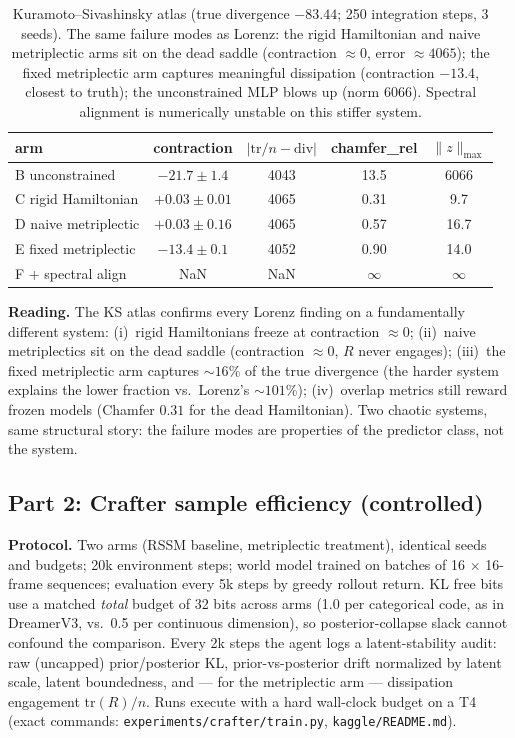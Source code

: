 \documentclass[preprint,12pt]{article}
\begin{document}
\begin{table}[t]
\centering
\small
\begin{tabular}{lcccc}
\toprule
arm & contraction & $|\mathrm{tr}/n - \mathrm{div}|$ & chamfer\_rel & $\|z\|_{\max}$ \\
\midrule
B unconstrained & $-21.7\pm1.4$ & 4043 & 13.5 & 6066 \\
C rigid Hamiltonian & $+0.03\pm0.01$ & 4065 & 0.31 & 9.7 \\
D naive metriplectic & $+0.03\pm0.16$ & 4065 & 0.57 & 16.7 \\
E fixed metriplectic & $\mathbf{-13.4\pm0.1}$ & 4052 & 0.90 & 14.0 \\
F + spectral align & NaN & NaN & $\infty$ & $\infty$ \\
\bottomrule
\end{tabular}
\caption{Kuramoto--Sivashinsky atlas (true divergence $-83.44$; 250
integration steps, 3 seeds). The same failure modes as Lorenz: the
rigid Hamiltonian and naive metriplectic arms sit on the dead saddle
(contraction $\approx 0$, error $\approx 4065$); the fixed metriplectic
arm captures meaningful dissipation (contraction $-13.4$, closest to
truth); the unconstrained MLP blows up (norm 6066). Spectral alignment
is numerically unstable on this stiffer system.}
\label{tab:ks}
\end{table}

\textbf{Reading.} The KS atlas confirms every Lorenz finding on a
fundamentally different system: (i)~rigid Hamiltonians freeze at
contraction $\approx 0$; (ii)~naive metriplectics sit on the dead saddle
(contraction $\approx 0$, $R$ never engages); (iii)~the fixed metriplectic
arm captures $\sim16\%$ of the true divergence (the harder system
explains the lower fraction vs.~Lorenz's $\sim101\%$); (iv)~overlap
metrics still reward frozen models (Chamfer $0.31$ for the dead
Hamiltonian). Two chaotic systems, same structural story: the failure
modes are properties of the predictor class, not the system.

\subsection{Part 2: Crafter sample efficiency (controlled)}

\textbf{Protocol.} Two arms (RSSM baseline, metriplectic treatment),
identical seeds and budgets; 20k environment steps; world model trained on
batches of 16 $\times$ 16-frame sequences; evaluation every 5k steps by
greedy rollout return. KL free bits use a matched \emph{total} budget of
32 bits across arms (1.0 per categorical code, as in DreamerV3, vs.~0.5
per continuous dimension), so posterior-collapse slack cannot confound the
comparison. Every 2k steps the agent logs a latent-stability audit: raw
(uncapped) prior/posterior KL, prior-vs-posterior drift normalized by
latent scale, latent boundedness, and --- for the metriplectic arm ---
dissipation engagement $\mathrm{tr}(R)/n$. Runs execute with a hard
wall-clock budget on a T4 (exact commands: \texttt{experiments/crafter/train.py},
\texttt{kaggle/README.md}).
\end{document}
